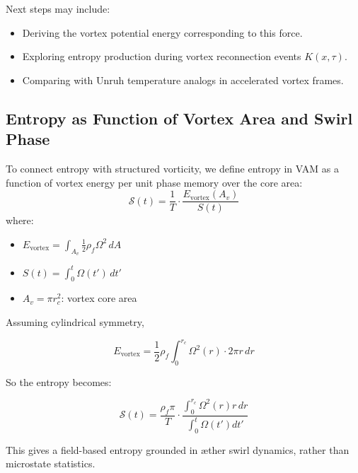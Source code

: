 \documentclass[preprint]{revtex4-2}
\begin{document}
            Next steps may include:
            \begin{itemize}
            \item Deriving the vortex potential energy corresponding to this force.
                \item Exploring entropy production during vortex reconnection events $K(x, \tau)$.
            \item Comparing with Unruh temperature analogs in accelerated vortex frames.
            \end{itemize}

            \subsection{Entropy as Function of Vortex Area and Swirl Phase}
            To connect entropy with structured vorticity, we define entropy in VAM as a function of vortex energy per unit phase memory over the core area:
            \begin{equation}
                \mathcal{S}(t) = \frac{1}{T} \cdot \frac{E_\text{vortex}(A_v)}{S(t)}
            \end{equation}
            where:
            \begin{itemize}
                \item $E_\text{vortex} = \int_{A_v} \frac{1}{2} \rho_{\scriptscriptstyle\boldsymbol\!f} \Omega^2 \, dA$
                \item $S(t) = \int_0^t \Omega(t') \, dt'$
                \item $A_v = \pi r_c^2$: vortex core area
            \end{itemize}

            Assuming cylindrical symmetry,

            \begin{equation}
            E_\text{vortex} = \frac{1}{2} \rho_{\scriptscriptstyle\boldsymbol\!f} \int_0^{r_c} \Omega^2(r) \cdot 2\pi r \, dr
            \end{equation}

            So the entropy becomes:

            \begin{equation}
            \boxed{
            \mathcal{S}(t) = \frac{\rho_{\scriptscriptstyle\boldsymbol\!f} \pi}{T} \cdot \frac{\int_0^{r_c} \Omega^2(r) r \, dr}{\int_0^t \Omega(t') dt'}
            }
            \end{equation}

            This gives a field-based entropy grounded in æther swirl dynamics, rather than microstate statistics.
\end{document}
